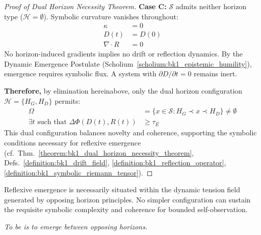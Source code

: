 \begin{proof}[Proof of Dual Horizon Necessity Theorem]
\textbf{Case C:} $\mathcal{S}$ admits neither horizon type ($\mathcal{H} = \emptyset$).  
Symbolic curvature vanishes throughout:
\begin{align}
\kappa &= 0 \\
D(t) &= D(0) \\
\nabla \cdot R &= 0
\end{align}
No horizon-induced gradients implies no drift or reflection dynamics. By the Dynamic Emergence Postulate (Scholium~\ref{scholium:bk1_epistemic_humility}), emergence requires symbolic flux. A system with $\partial D/\partial t = 0$ remains inert.

\textbf{Therefore,} by elimination hereinabove, only the dual horizon configuration $\mathcal{H} = \{H_G, H_D\}$ permits:
\begin{align}
\Omega &= \{x \in \mathcal{S} : H_G \prec x \prec H_D\} \neq \emptyset \\
\exists t \text{ such that } \Delta\Phi(D(t), R(t)) &\geq \tau_E
\end{align}
This dual configuration balances novelty and coherence, supporting the symbolic conditions necessary for reflexive emergence (cf.~Thm.~\ref{theorem:bk1_dual_horizon_necessity_theorem}, Defs.~\ref{definition:bk1_drift_field}, \ref{definition:bk1_reflection_operator}, \ref{definition:bk1_symbolic_riemann_tensor}).
\end{proof}
\begin{corollary}
\label{corollary:bk1_horizon_duality_principle}
Reflexive emergence is necessarily situated within the dynamic tension field generated by opposing horizon principles. No simpler configuration can sustain the requisite symbolic complexity and coherence for bounded self-observation.
\end{corollary}
\begin{flushright}
\textit{To be is to emerge between opposing horizons.}
\end{flushright}


